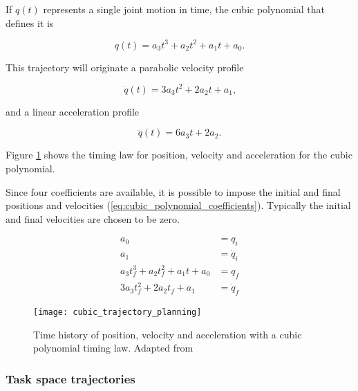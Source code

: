 If $q(t)$ represents a single joint motion in time, the cubic polynomial that defines it is

\begin{equation}
    q(t) = a_3 t^3 + a_2 t^2 + a_1 t + a_0 \text{.}
\end{equation}

This trajectory will originate a parabolic velocity profile

\begin{equation}
    \dot{q}(t) = 3 a_3 t^2 + 2 a_2 t + a_1\text{,}
\end{equation}

and a linear acceleration profile

\begin{equation}
    \ddot{q}(t) = 6 a_3 t + 2 a_2\text{.}
\end{equation}

Figure \ref{fig:cubic_trajectory_planning} shows the timing law for position, velocity and acceleration for the cubic polynomial.

Since four coefficients are available, it is possible to impose the initial and final positions and velocities (\ref{eq:cubic_polynomial_coefficients}). Typically the initial and final velocities are chosen to be zero.

\begin{equation}
    \label{eq:cubic_polynomial_coefficients}
    \begin{aligned}
        a_0 &= q_i\\
        a_1 &= \dot{q}_i \\
        a_3 t_f^3 + a_2 t_f^2 + a_1 t + a_0 &= q_f \\
        3 a_3 t_f^2 + 2 a_2 t_f + a_1 &= \dot{q}_f 
    \end{aligned}
\end{equation}

\begin{figure}[htbp]
	\centering
	\texttt{[image: cubic\_trajectory\_planning]}
	\caption[Time history of position, velocity and acceleration with a cubic polynomial timing law.]{Time history of position, velocity and acceleration with a cubic polynomial timing law. Adapted from \cite{Siciliano2009_robotics_modelling_planning_control}}
	\label{fig:cubic_trajectory_planning}
\end{figure}


\subsubsection{Task space trajectories}
\label{subsubsec:task_space_trajectories}

